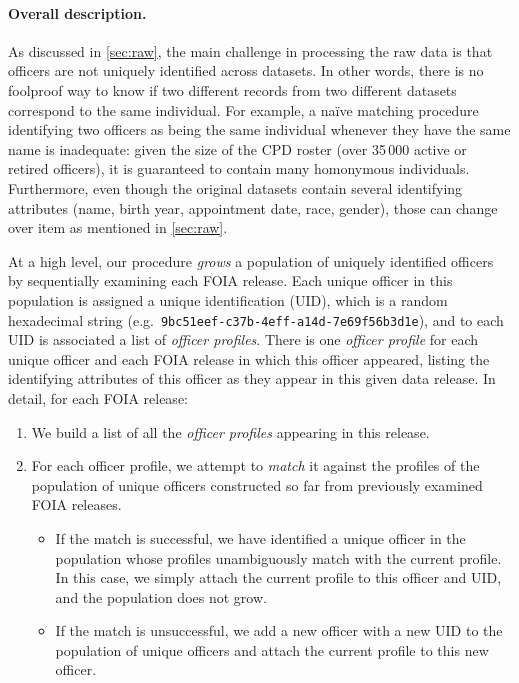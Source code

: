 \paragraph{Overall description.}

As discussed in \cref{sec:raw}, the main challenge in processing the raw data
is that officers are not uniquely identified across datasets. In other words,
there is no foolproof way to know if two different records from two different
datasets correspond to the same individual. For example, a na\"ive matching
procedure identifying two officers as being the same individual whenever they
have the same name is inadequate: given the size of the CPD roster (over 35\,000
active or retired officers), it is guaranteed to contain many homonymous
individuals. Furthermore, even though the original datasets contain several
identifying attributes (name, birth year, appointment date, race, gender),
those can change over item as mentioned in \cref{sec:raw}.

At a high level, our procedure \emph{grows} a population of uniquely identified
officers by sequentially examining each FOIA release. Each unique officer in
this population is assigned a unique identification (UID), which is a random
hexadecimal string (e.g.\ \texttt{9bc51eef-c37b-4eff-a14d-7e69f56b3d1e}), and
to each UID is associated a list of \emph{officer profiles}. There is one
\emph{officer profile} for each unique officer and each FOIA release in which
this officer appeared, listing the identifying attributes of this officer as
they appear in this given data release. In detail, for each FOIA release:
\begin{enumerate}
	\item We build a list of all the \emph{officer profiles} appearing in this
		release.
	\item For each officer profile, we attempt to \emph{match} it against the
		profiles of the population of unique officers constructed so far from
		previously examined FOIA releases.
		\begin{itemize}
			\item If the match is successful, we have identified a unique officer in
				the population whose profiles unambiguously match with the
				current profile. In this case, we simply attach the current
				profile to this officer and UID, and
				the population does not grow.
			\item If the match is unsuccessful, we add a new officer with a new UID to the population of unique
				officers and attach the current profile to this new officer.
		\end{itemize}
\end{enumerate}

